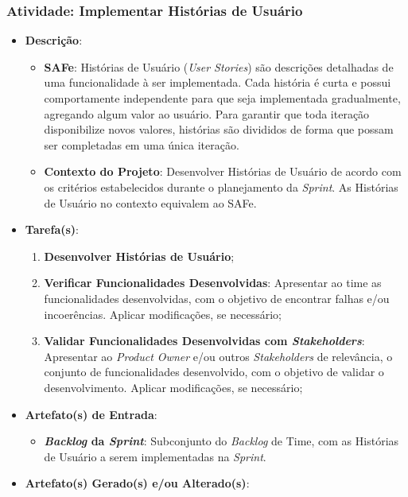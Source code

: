 			\subsubsection[Atividade: Implementar Histórias de Usuário]{Atividade: Implementar Histórias de Usuário}
			\label{subsubsec:processo_atividade_time_implementar_us}
				\begin{itemize}
					\item{\textbf{Descrição}:
						\begin{itemize}
							\item{\textbf{SAFe}: Histórias de Usuário (\emph{User Stories}) são descrições detalhadas de uma funcionalidade à ser implementada. Cada história é curta e possui comportamente independente para que seja implementada gradualmente, agregando algum valor ao usuário. Para garantir que toda iteração disponibilize novos valores, histórias são divididos de forma que possam ser completadas em uma única iteração.}
							\item{\textbf{Contexto do Projeto}: Desenvolver Histórias de Usuário de acordo com os critérios estabelecidos durante o planejamento da \emph{Sprint}. As Histórias de Usuário no contexto equivalem ao SAFe.}
						\end{itemize}}
					\item{\textbf{Tarefa(s)}:
						\begin{enumerate}
							\item{\textbf{Desenvolver Histórias de Usuário};}
							\item{\textbf{Verificar Funcionalidades Desenvolvidas}: Apresentar ao time as funcionalidades desenvolvidas, com o objetivo de encontrar falhas e/ou incoerências. Aplicar modificações, se necessário;}
							\item{\textbf{Validar Funcionalidades Desenvolvidas com \emph{Stakeholders}}: Apresentar ao \emph{Product Owner} e/ou outros \emph{Stakeholders} de relevância, o conjunto de funcionalidades desenvolvido, com o objetivo de validar o desenvolvimento. Aplicar modificações, se necessário;}
						\end{enumerate}}
					\item{\textbf{Artefato(s) de Entrada}:
						\begin{itemize}
							\item{\textbf{\emph{Backlog} da \emph{Sprint}}: Subconjunto do \emph{Backlog} de Time, com as Histórias de Usuário a serem implementadas na \emph{Sprint}.}
						\end{itemize}}
					\item{\textbf{Artefato(s) Gerado(s) e/ou Alterado(s)}:
}
\end{itemize}
